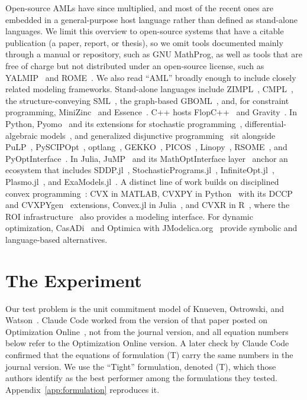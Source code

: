 \documentclass[11pt]{article}
\begin{document}
Open-source AMLs have since multiplied, and most of the recent ones are embedded in a general-purpose host language rather than defined as stand-alone languages. We limit this overview to open-source systems that have a citable publication (a paper, report, or thesis), so we omit tools documented mainly through a manual or repository, such as GNU MathProg, as well as tools that are free of charge but not distributed under an open-source license, such as YALMIP~\cite{lofberg2004,lofberg2012} and ROME~\cite{goh2011}. We also read ``AML'' broadly enough to include closely related modeling frameworks. Stand-alone languages include ZIMPL~\cite{koch2004,dorndorf2012}, CMPL~\cite{steglich2010}, the structure-conveying SML~\cite{colombo2009}, the graph-based GBOML~\cite{miftari2022}, and, for constraint programming, MiniZinc~\cite{nethercote2007} and Essence~\cite{frisch2008}. C++ hosts FlopC++~\cite{hultberg2007,wolf2011} and Gravity~\cite{hijazi2018}. In Python, Pyomo~\cite{hart2011,bynum2021} and its extensions for stochastic programming~\cite{watson2012,knueven2023}, differential-algebraic models~\cite{nicholson2018}, and generalized disjunctive programming~\cite{chen2022} sit alongside PuLP~\cite{mitchell2011}, PySCIPOpt~\cite{maher2016}, optlang~\cite{jensen2017}, GEKKO~\cite{beal2018}, PICOS~\cite{sagnol2022}, Linopy~\cite{hofmann2023}, RSOME~\cite{chen2020rsome,chen2023rsome}, and PyOptInterface~\cite{yang2024}. In Julia, JuMP~\cite{lubin2015,dunning2017,lubin2023} and its MathOptInterface layer~\cite{legat2022} anchor an ecosystem that includes SDDP.jl~\cite{dowson2021}, StochasticPrograms.jl~\cite{biel2022}, InfiniteOpt.jl~\cite{pulsipher2022}, Plasmo.jl~\cite{jalving2022}, and ExaModels.jl~\cite{shin2024}. A distinct line of work builds on disciplined convex programming~\cite{grant2006,grant2008}: CVX in MATLAB, CVXPY in Python~\cite{diamond2016,agrawal2018} with its DCCP~\cite{shen2016} and CVXPYgen~\cite{schaller2022} extensions, Convex.jl in Julia~\cite{udell2014}, and CVXR in R~\cite{fu2020}, where the ROI infrastructure~\cite{theussl2020} also provides a modeling interface. For dynamic optimization, CasADi~\cite{andersson2019} and Optimica with JModelica.org~\cite{akesson2010} provide symbolic and language-based alternatives.

\section{The Experiment}

Our test problem is the unit commitment model of Knueven, Ostrowski, and Watson~\cite{knueven2020}. Claude Code worked from the version of that paper posted on Optimization Online~\cite{knueven2018ool}, not from the journal version, and all equation numbers below refer to the Optimization Online version. A later check by Claude Code confirmed that the equations of formulation (T) carry the same numbers in the journal version. We use the ``Tight'' formulation, denoted (T), which those authors identify as the best performer among the formulations they tested. Appendix~\ref{app:formulation} reproduces it.
\end{document}
